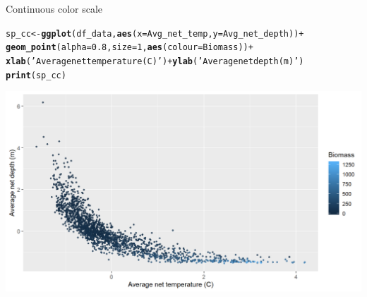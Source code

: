 \documentclass{beamer}\usepackage[]{graphicx}\usepackage[]{color}
\makeatletter
\newcommand{\hlnum}[1]{\textcolor[rgb]{0.686,0.059,0.569}{#1}}%
\newcommand{\hlstr}[1]{\textcolor[rgb]{0.192,0.494,0.8}{#1}}%
\newcommand{\hlopt}[1]{\textcolor[rgb]{0,0,0}{#1}}%
\newcommand{\hlstd}[1]{\textcolor[rgb]{0.345,0.345,0.345}{#1}}%
\newcommand{\hlkwb}[1]{\textcolor[rgb]{0.69,0.353,0.396}{#1}}%
\newcommand{\hlkwc}[1]{\textcolor[rgb]{0.333,0.667,0.333}{#1}}%
\newcommand{\hlkwd}[1]{\textcolor[rgb]{0.737,0.353,0.396}{\textbf{#1}}}%
\newenvironment{kframe}{%
 \def\at@end@of@kframe{}%
 \ifinner\ifhmode%
  \def\at@end@of@kframe{\end{minipage}}%
  \begin{minipage}{\columnwidth}%
 \fi\fi%
 \def\FrameCommand##1{\hskip\@totalleftmargin \hskip-\fboxsep
 \colorbox{shadecolor}{##1}\hskip-\fboxsep
     \hskip-\linewidth \hskip-\@totalleftmargin \hskip\columnwidth}%
 \MakeFramed {\advance\hsize-\width
   \@totalleftmargin\z@ \linewidth\hsize
   \@setminipage}}%
 {\par\unskip\endMakeFramed%
 \at@end@of@kframe}
\newenvironment{knitrout}{}{} %
\makeatother
\begin{document}
\begin{frame}[fragile]{Continuous color scale}
\begin{knitrout}\footnotesize
{}\color{fgcolor}\begin{kframe}
\begin{alltt}
\hlstd{sp_cc} \hlkwb{<-} \hlkwd{ggplot}\hlstd{(df_data,} \hlkwd{aes}\hlstd{(}\hlkwc{x}\hlstd{=Avg_net_temp,} \hlkwc{y}\hlstd{=Avg_net_depth))} \hlopt{+}
  \hlkwd{geom_point}\hlstd{(}\hlkwc{alpha}\hlstd{=}\hlnum{0.8}\hlstd{,} \hlkwc{size}\hlstd{=}\hlnum{1}\hlstd{,} \hlkwd{aes}\hlstd{(}\hlkwc{colour}\hlstd{=Biomass))} \hlopt{+}
  \hlkwd{xlab}\hlstd{(}\hlstr{'Average net temperature (C)'}\hlstd{)} \hlopt{+} \hlkwd{ylab}\hlstd{(}\hlstr{'Average net depth (m)'}\hlstd{)}
\hlkwd{print}\hlstd{(sp_cc)}
\end{alltt}
\end{kframe}

{\centering \includegraphics[width=.9\linewidth]{figure/sp_continuous_color1-1} 

}



\end{knitrout}
\end{frame}
\end{document}

